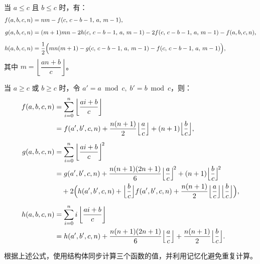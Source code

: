 当 $a \le c$ 且 $b \le c$ 时，有：
\[
\begin{aligned}
f(a,b,c,n) &= n m - f(c,\,c-b-1,\,a,\,m-1),\\[2mm]
g(a,b,c,n) &= (m+1)mn - 2h(c,\,c-b-1,\,a,\,m-1) - 2f(c,\,c-b-1,\,a,\,m-1) - f(a,b,c,n),\\[2mm]
h(a,b,c,n) &= \frac{1}{2}\Bigl(mn(m+1) - g(c,\,c-b-1,\,a,\,m-1) - f(c,\,c-b-1,\,a,\,m-1)\Bigr),
\end{aligned}
\]
其中 $m = \left\lfloor \dfrac{an+b}{c} \right\rfloor$。

当 $a \ge c$ 或 $b \ge c$ 时，令 $a' = a \bmod c,\; b' = b \bmod c$，则：
\[
\begin{aligned}
f(a,b,c,n) &= \sum_{i=0}^n \left\lfloor\frac{ai+b}{c}\right\rfloor \\
&= f(a',b',c,n) + \frac{n(n+1)}{2}\Bigl\lfloor\frac{a}{c}\Bigr\rfloor + (n+1)\Bigl\lfloor\frac{b}{c}\Bigr\rfloor,\\[2mm]
g(a,b,c,n) &= \sum_{i=0}^n \left\lfloor\frac{ai+b}{c}\right\rfloor^{\!2} \\
&= g(a',b',c,n) + \frac{n(n+1)(2n+1)}{6}\Bigl\lfloor\frac{a}{c}\Bigr\rfloor^{\!2} + (n+1)\Bigl\lfloor\frac{b}{c}\Bigr\rfloor^{\!2} \\
&\quad + 2\Bigl( h(a',b',c,n) + \Bigl\lfloor\frac{b}{c}\Bigr\rfloor f(a',b',c,n) + \frac{n(n+1)}{2}\Bigl\lfloor\frac{a}{c}\Bigr\rfloor\Bigl\lfloor\frac{b}{c}\Bigr\rfloor \Bigr),\\[2mm]
h(a,b,c,n) &= \sum_{i=0}^n i\left\lfloor\frac{ai+b}{c}\right\rfloor \\
&= h(a',b',c,n) + \frac{n(n+1)(2n+1)}{6}\Bigl\lfloor\frac{a}{c}\Bigr\rfloor + \frac{n(n+1)}{2}\Bigl\lfloor\frac{b}{c}\Bigr\rfloor.
\end{aligned}
\]

根据上述公式，使用结构体同步计算三个函数的值，并利用记忆化避免重复计算。